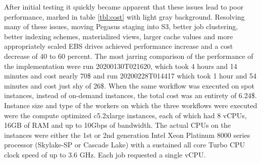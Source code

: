 \documentclass[a4paper, 10pt, conference]{ieeeconf}
\begin{document}
After initial testing it quickly became apparent that these issues lead to poor performance, marked in table \ref{tbl:cost} with light gray background. Resolving many of these issues, moving Pegasus staging into S3, better job clustering, better indexing schemes, materialized views, larger cache values and more appropriately scaled EBS drives achieved performance increase and a cost decrease of 40 to 60 percent. The most jarring comparison of the performance of the implementation were run 20200130T021620, which took 4 hours and 14 minutes and cost nearly 70\$ and run 20200228T014417 which took 1 hour and 54 minutes and cost just shy of 26\$. When the same workflow was executed on spot instances, instead of on-demand instances, the total cost was an entirety of 6.24\$. Instance size and type of the workers on which the three workflows were executed were the compute optimized c5.2xlarge instances, each of which had 8 vCPUs, 16GB of RAM and up to 10Gbps of bandwidth. The actual CPUs on the instances were either the 1st or 2nd generation Intel Xeon Platinum 8000 series processor (Skylake-SP or Cascade Lake) with a sustained all core Turbo CPU clock speed of up to 3.6 GHz. Each job requested a single vCPU. 
\end{document}
